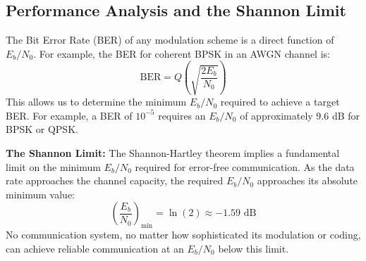\subsection{Performance Analysis and the Shannon Limit}

The Bit Error Rate (BER) of any modulation scheme is a direct function of $E_b/N_0$. For example, the BER for coherent BPSK in an AWGN channel is:
\begin{equation}
    \text{BER} = Q\left(\sqrt{\frac{2E_b}{N_0}}\right)
\end{equation}
This allows us to determine the minimum $E_b/N_0$ required to achieve a target BER. For example, a BER of $10^{-5}$ requires an $E_b/N_0$ of approximately 9.6 dB for BPSK or QPSK.

\begin{warningbox}
    \textbf{The Shannon Limit:} The Shannon-Hartley theorem implies a fundamental limit on the minimum $E_b/N_0$ required for error-free communication. As the data rate approaches the channel capacity, the required $E_b/N_0$ approaches its absolute minimum value:
    \[ \left(\frac{E_b}{N_0}\right)_{\min} = \ln(2) \approx -1.59 \text{ dB} \]
    No communication system, no matter how sophisticated its modulation or coding, can achieve reliable communication at an $E_b/N_0$ below this limit.
\end{warningbox}


